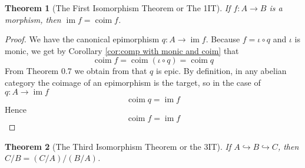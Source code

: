 \documentclass{article}
\DeclareMathOperator{\im}{\mathrm{im}}
\DeclareMathOperator{\coim}{\mathrm{coim}}
\newtheorem{theorem}{Theorem}[section]
\begin{document}
\begin{theorem}[The First Isomorphism Theorem or The 1IT]\label{thm:1IT}
    If $f:A\to B$ is a morphism, then $\im f= \coim f$.
\end{theorem}
\begin{proof}
    We have the canonical epimorphism $q:A\to \im f$. Because $f=\iota \circ q$ and $\iota$ is monic, we get by Corollary \ref{cor:comp with monic and coim} that
    \[
    \coim f=\coim (\iota \circ q)=\coim q
    \]
    From Theorem 0.7 we obtain from that $q$ is epic. By definition, in any abelian category the coimage of an epimorphism is the target, so in the case of $q:A\to \im f$
    \[
    \coim q=\im f
    \]
    Hence
    \[
    \coim f=\im f
    \]
\end{proof}
\begin{theorem}[The Third Isomorphism Theorem or the 3IT]\label{thm:3IT}
    If $A\hookrightarrow B\hookrightarrow C$, then $C/B=(C/A)/(B/A)$.
\end{theorem}
\end{document}
